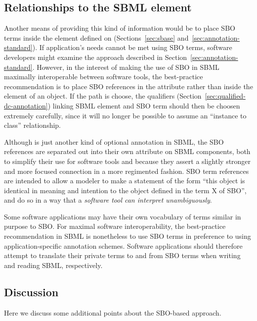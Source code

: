 \subsection{Relationships to the SBML  element}
\begin{blockChanged}
Another means of providing this kind of information would be to
place SBO terms inside the  element
defined on \SBase (Sections~\ref{sec:sbase} and~\ref{sec:annotation-standard}).
If application's needs cannot be met using SBO terms, software developers might
examine the approach described in Section~\ref{sec:annotation-standard}. 
However, in the interest of making the use of SBO in SBML
maximally interoperable between software tools, the best-practice
recommendation is to place SBO references in the 
attribute rather than inside the 
element of an object. If the  path is choose, the qualifiers (Section~\ref{sec:qualified-dc-annotation}) linking SBML element and SBO term should then be choosen extremely carefully, since it will no longer be possible to assume an ``instance to class'' relationship. 
\end{blockChanged}

Although  is just another kind of optional
annotation in SBML, the SBO references are separated out into
their own attribute on SBML components, both to simplify their use
for software tools and because they assert a slightly stronger and
more focused connection in a more regimented fashion.  SBO term
references are intended to allow a modeler to make a statement of
the form ``this object is identical in meaning and intention to
the object defined in the term X of SBO'', and do so in a way
that a \emph{software tool can interpret unambiguously}.

Some software applications may have their own vocabulary of terms
similar in purpose to SBO.  For maximal software interoperability,
the best-practice recommendation in SBML is nonetheless to use SBO
terms in preference to using application-specific annotation
schemes.  Software applications should therefore attempt to
translate their private terms to and from SBO terms when writing
and reading SBML, respectively.


\subsection{Discussion}

Here we discuss some additional points about the SBO-based
approach.

